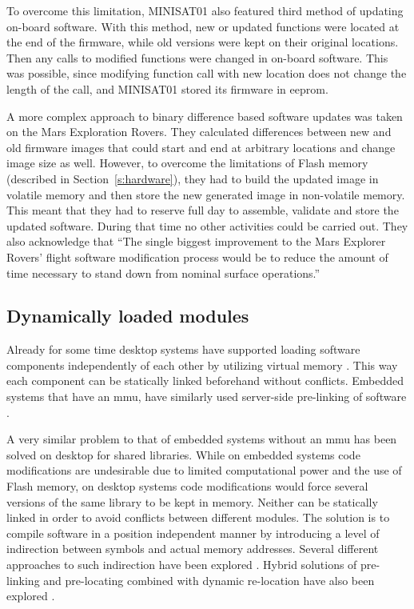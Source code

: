 To overcome this limitation, MINISAT01 also featured third method of updating on-board software. With this method, new or updated functions were located at the end of the firmware, while old versions were kept on their original locations. Then any calls to modified functions were changed in on-board software. This was possible, since modifying function call with new location does not change the length of the call, and MINISAT01 stored its firmware in \gls{eeprom}. \cite{Garrido1998}

A more complex approach to binary difference based software updates was taken on the Mars Exploration Rovers. They calculated differences between new and old firmware images that could start and end at arbitrary locations and change image size as well. However, to overcome the limitations of Flash memory (described in Section~\ref{s:hardware}), they had to build the updated image in volatile memory and then store the new generated image in non-volatile memory. This meant that they had to reserve full day to assemble, validate and store the updated software. During that time no other activities could be carried out. They also acknowledge that ``The single biggest improvement to the Mars Explorer Rovers' flight software modification process would be to reduce the amount of time necessary to stand down from nominal surface operations.'' \cite{Greco2005}

\subsection{Dynamically loaded modules}

Already for some time desktop systems have supported loading software components independently of each other by utilizing virtual memory \cite{Kilburn1962}. This way each component can be statically linked beforehand without conflicts. Embedded systems that have an \gls{mmu}, have similarly used server-side pre-linking of software \cite{Shen2010}.

A very similar problem to that of embedded systems without an \gls{mmu} has been solved on desktop for shared libraries. While on embedded systems code modifications are undesirable due to limited computational power and the use of Flash memory, on desktop systems code modifications would force several versions of the same library to be kept in memory. Neither can be statically linked in order to avoid conflicts between different modules. The solution is to compile software in a position independent manner by introducing a level of indirection between symbols and actual memory addresses. Several different approaches to such indirection have been explored \cite[Chapter~8]{Levine1999}. Hybrid solutions of pre-linking and pre-locating combined with dynamic re-location have also been explored \cite{Dong2009}.

